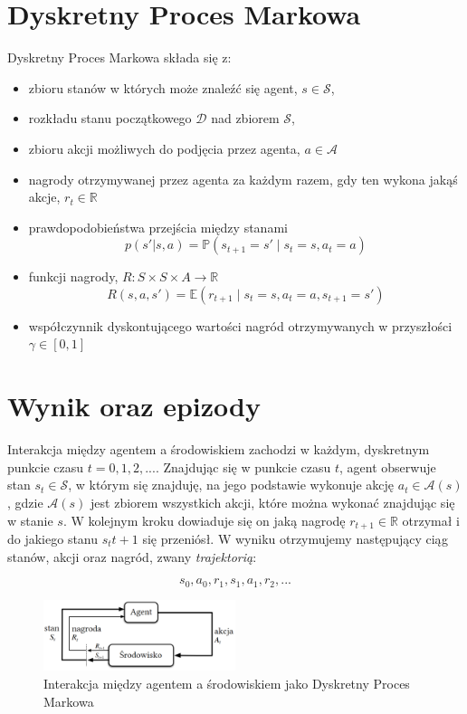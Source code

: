 \documentclass[licencjacka]{pracamgr}
\begin{document}
\section{Dyskretny Proces Markowa}

Dyskretny Proces Markowa składa się z:
\begin{itemize}
\item zbioru stanów w których może znaleźć się agent, $ s \in \mathcal{S} $,
\item rozkładu stanu początkowego $\mathcal{D}$ nad zbiorem $\mathcal{S}$,
\item zbioru akcji możliwych do podjęcia przez agenta, $ a \in \mathcal{A} $
\item nagrody otrzymywanej przez agenta za każdym razem, gdy ten wykona jakąś akcje, $ r_t \in \mathbb{R} $
\item prawdopodobieństwa przejścia między stanami
$$ p(s'|s, a) = \mathbb{P}(s_{t+1} = s' \mid s_t = s, a_t = a)$$
\item funkcji nagrody, $ R : S \times S \times A \rightarrow \mathbb{R} $
$$ R(s, a, s') = \mathbb{E}(r_{t+1} \mid s_t = s, a_t = a, s_{t+1} = s') $$
\item współczynnik dyskontującego wartości nagród otrzymywanych w przyszłości $ \gamma \in [0, 1] $
\end{itemize}


\section{Wynik oraz epizody}

Interakcja między agentem a środowiskiem zachodzi w każdym, dyskretnym punkcie czasu $ t = 0, 1, 2, ... $. Znajdując się w punkcie czasu $t$, agent obserwuje stan $ s_t \in \mathcal{S} $, w którym się znajduję, na jego podstawie wykonuje akcję $ a_t \in \mathcal{A}(s) $, gdzie $ \mathcal{A}(s) $ jest zbiorem wszystkich akcji, które można wykonać znajdując się w stanie $s$. W kolejnym kroku dowiaduje się on jaką nagrodę $ r_{t+1} \in \mathbb{R} $ otrzymał i do jakiego stanu $ s_t{t+1} $ się przeniósł. W wyniku otrzymujemy następujący ciąg stanów, akcji oraz nagród, zwany \emph{trajektorią}:

$$ s_0, a_0, r_1, s_1, a_1, r_2, ... $$


\begin{figure}[ht]
  \centering
  \includegraphics[width=0.5\textwidth]{agent_env_interaction}
  \caption{Interakcja między agentem a środowiskiem jako Dyskretny Proces Markowa}
\end{figure}
\end{document}
